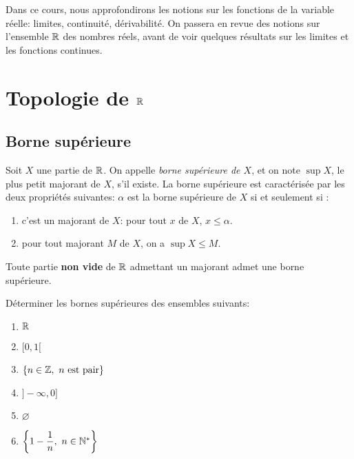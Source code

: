\documentclass[../main.tex]{subfiles}
\begin{document}

    Dans ce cours, nous approfondirons les notions sur les fonctions de la variable réelle: limites, continuité, dérivabilité. On passera en revue des notions sur l'ensemble $\mathbb R$ des nombres réels, avant de voir quelques résultats sur les limites et les fonctions continues.


\section{Topologie de $\mathbb R$}

\subsection{Borne supérieure}

\begin{mydef}\label{defsup}
    Soit $X$ une partie de $\mathbb R$. On appelle \textit{borne supérieure de $X$}, et on note $\sup X$, le plus petit majorant de $X$, s'il existe. La borne supérieure est caractérisée par les deux propriétés suivantes: $\alpha$ est la borne supérieure de $X$ si et seulement si :\begin{enumerate}
        \item c'est un majorant de $X$: pour tout $x$ de $X$, $x\leq \alpha$.
        \item pour tout majorant $M$ de $X$, on a $\sup X\leq M$.
    \end{enumerate}
\end{mydef}

\begin{thm}
    Toute partie \textbf{non vide} de $\mathbb R$ admettant un majorant admet une borne supérieure.
\end{thm}

\begin{exo}[F]
    Déterminer les bornes supérieures des ensembles suivants:
    \begin{multicols}{2}
    \begin{enumerate}
        \item $\mathbb R$
        \item $[0,1[$
        \item $\{n\in\mathbb Z,\ n\text{ est pair}\}$
        \item $]-\infty, 0]$
        \item $\varnothing$
        \item $\left\{1-\dfrac{1}{n},\ n\in\N^*\right\}$
    \end{enumerate}
    \end{multicols}
\end{exo}
\end{document}
